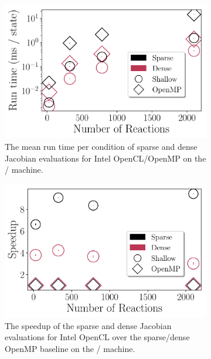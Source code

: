 \documentclass[12pt,number,sort&compress,preprint]{elsarticle}
\begin{document}
\begin{figure}[htbp]
   \centering
  \begin{subfigure}[t]{0.48\linewidth}
      \includegraphics[width=\textwidth]{sparse_vs_dense.pdf}
      \caption{The mean run time per condition of sparse and dense Jacobian evaluations for Intel OpenCL\slash OpenMP on the \avx/ machine.}
      \label{F:sparse_vs_dense}
  \end{subfigure}
  \hfill
  \begin{subfigure}[t]{0.48\linewidth}
      \includegraphics[width=\textwidth]{sparse_vs_dense_speedup.pdf}
      \caption{The speedup of the sparse and dense Jacobian evaluations for Intel OpenCL over the sparse\slash dense OpenMP baseline on the \avx/ machine.}
      \label{F:sparse_vs_dense_speedup}
  \end{subfigure}
  \\
  \begin{subfigure}[t]{0.48\linewidth}

\end{subfigure}
\end{figure}
\end{document}
